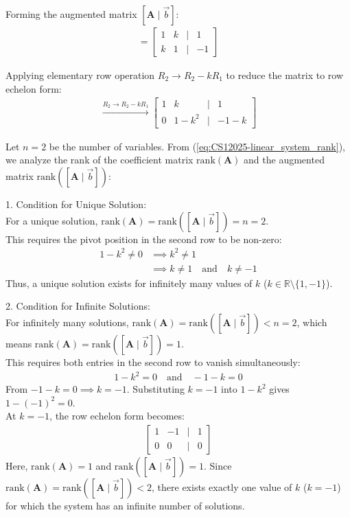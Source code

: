 \begin{enumerate}[label=\thesubsection.\arabic*, ref=\thesubsection.\theenumi]
Forming the augmented matrix $[\mathbf{A} \mid \vec{b}]$:
\begin{align}
[\mathbf{A} \mid \vec{b}] = 
\begin{bmatrix} 
1 & k & \mid & 1 \\ 
k & 1 & \mid & -1 
\end{bmatrix}
\end{align}

Applying elementary row operation $R_2 \to R_2 - k R_1$ to reduce the matrix to row echelon form:
\begin{align}
[\mathbf{A} \mid \vec{b}] \xrightarrow{R_2 \to R_2 - k R_1} 
\begin{bmatrix} 
1 & k & \mid & 1 \\ 
0 & 1 - k^2 & \mid & -1 - k 
\end{bmatrix}
\end{align}

Let $n = 2$ be the number of variables. From (\ref{eq:CS12025-linear_system_rank}), we analyze the rank of the coefficient matrix $\text{rank}(\mathbf{A})$ and the augmented matrix $\text{rank}([\mathbf{A} \mid \vec{b}])$:

1. Condition for Unique Solution: \\
For a unique solution, $\text{rank}(\mathbf{A}) = \text{rank}([\mathbf{A} \mid \vec{b}]) = n = 2$. \\
This requires the pivot position in the second row to be non-zero:
\begin{align}
1 - k^2 \neq 0 &\implies k^2 \neq 1 \\
               &\implies k \neq 1 \quad \text{and} \quad k \neq -1
\end{align}
Thus, a unique solution exists for infinitely many values of $k$ ($k \in \mathbb{R} \setminus \{1, -1\}$).

2. Condition for Infinite Solutions: \\
For infinitely many solutions, $\text{rank}(\mathbf{A}) = \text{rank}([\mathbf{A} \mid \vec{b}]) < n = 2$, which means $\text{rank}(\mathbf{A}) = \text{rank}([\mathbf{A} \mid \vec{b}]) = 1$. \\
This requires both entries in the second row to vanish simultaneously:
\begin{align}
1 - k^2 = 0 \quad \text{and} \quad -1 - k = 0
\end{align}
From $-1 - k = 0 \implies k = -1$. Substituting $k = -1$ into $1 - k^2$ gives $1 - (-1)^2 = 0$. \\
At $k = -1$, the row echelon form becomes:
\begin{align}
\begin{bmatrix} 
1 & -1 & \mid & 1 \\ 
0 & 0 & \mid & 0 
\end{bmatrix}
\end{align}
Here, $\text{rank}(\mathbf{A}) = 1$ and $\text{rank}([\mathbf{A} \mid \vec{b}]) = 1$. Since $\text{rank}(\mathbf{A}) = \text{rank}([\mathbf{A} \mid \vec{b}]) < 2$, there exists exactly one value of $k$ ($k = -1$) for which the system has an infinite number of solutions.


\end{enumerate}
